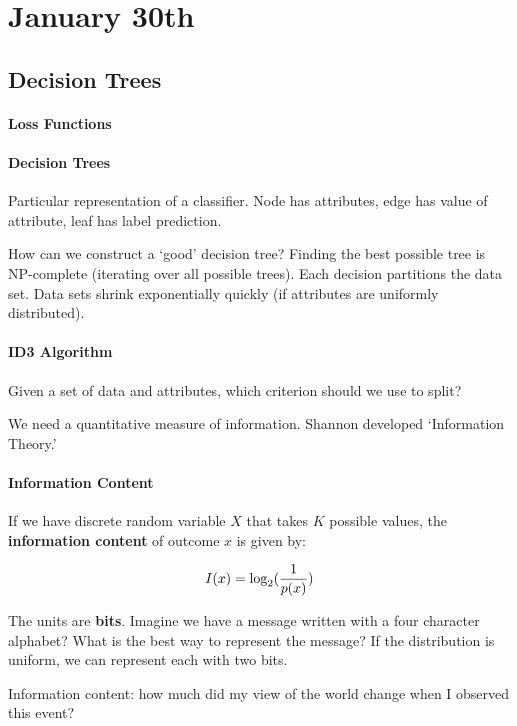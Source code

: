 \section{January 30th}

\subsection{Decision Trees}

\paragraph{Loss Functions}

\paragraph{Decision Trees} Particular representation of a classifier. Node has attributes, edge has value of attribute, leaf has label prediction.

How can we construct a `good' decision tree? Finding the best possible tree is NP-complete (iterating over all possible trees). Each decision partitions the data set. Data sets shrink exponentially quickly (if attributes are uniformly distributed).

\paragraph{ID3 Algorithm} Given a set of data and attributes, which criterion should we use to split?

We need a quantitative measure of information. Shannon developed `Information Theory.'

\paragraph{Information Content} If we have discrete random variable $X$ that takes $K$ possible values, the \textbf{information content} of outcome $x$ is given by:

\[
	I(x) = \log_2({1 \over p(x)})
\]

The units are \textbf{bits}. Imagine we have a message written with a four character alphabet? What is the best way to represent the message? If the distribution is uniform, we can represent each with two bits. 

Information content: how much did my view of the world change when I observed this event?

